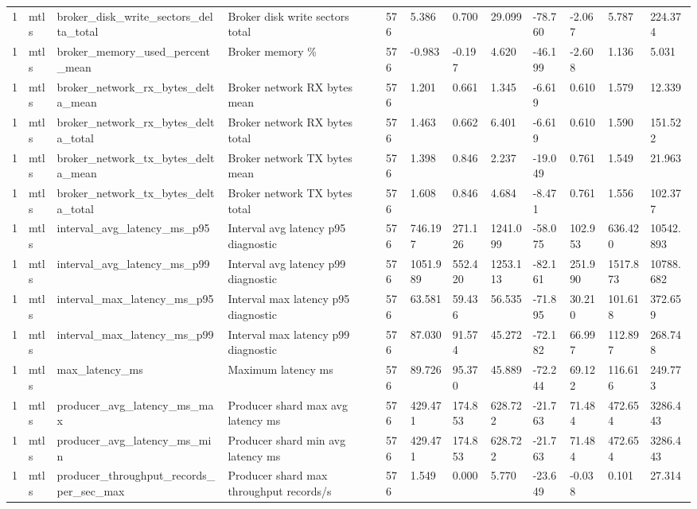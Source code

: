 \begin{longtable}{llllllllllll}
1 & mtls & broker\_disk\_write\_sectors\_delta\_total & Broker disk write sectors total & 576 & 5.386 & 0.700 & 29.099 & -78.760 & -2.067 & 5.787 & 224.374 \\
1 & mtls & broker\_memory\_used\_percent\_mean & Broker memory \% & 576 & -0.983 & -0.197 & 4.620 & -46.199 & -2.608 & 1.136 & 5.031 \\
1 & mtls & broker\_network\_rx\_bytes\_delta\_mean & Broker network RX bytes mean & 576 & 1.201 & 0.661 & 1.345 & -6.619 & 0.610 & 1.579 & 12.339 \\
1 & mtls & broker\_network\_rx\_bytes\_delta\_total & Broker network RX bytes total & 576 & 1.463 & 0.662 & 6.401 & -6.619 & 0.610 & 1.590 & 151.522 \\
1 & mtls & broker\_network\_tx\_bytes\_delta\_mean & Broker network TX bytes mean & 576 & 1.398 & 0.846 & 2.237 & -19.049 & 0.761 & 1.549 & 21.963 \\
1 & mtls & broker\_network\_tx\_bytes\_delta\_total & Broker network TX bytes total & 576 & 1.608 & 0.846 & 4.684 & -8.471 & 0.761 & 1.556 & 102.377 \\
1 & mtls & interval\_avg\_latency\_ms\_p95 & Interval avg latency p95 diagnostic & 576 & 746.197 & 271.126 & 1241.099 & -58.075 & 102.953 & 636.420 & 10542.893 \\
1 & mtls & interval\_avg\_latency\_ms\_p99 & Interval avg latency p99 diagnostic & 576 & 1051.989 & 552.420 & 1253.113 & -82.161 & 251.990 & 1517.873 & 10788.682 \\
1 & mtls & interval\_max\_latency\_ms\_p95 & Interval max latency p95 diagnostic & 576 & 63.581 & 59.436 & 56.535 & -71.895 & 30.210 & 101.618 & 372.659 \\
1 & mtls & interval\_max\_latency\_ms\_p99 & Interval max latency p99 diagnostic & 576 & 87.030 & 91.574 & 45.272 & -72.182 & 66.997 & 112.897 & 268.748 \\
1 & mtls & max\_latency\_ms & Maximum latency ms & 576 & 89.726 & 95.370 & 45.889 & -72.244 & 69.122 & 116.616 & 249.773 \\
1 & mtls & producer\_avg\_latency\_ms\_max & Producer shard max avg latency ms & 576 & 429.471 & 174.853 & 628.722 & -21.763 & 71.484 & 472.654 & 3286.443 \\
1 & mtls & producer\_avg\_latency\_ms\_min & Producer shard min avg latency ms & 576 & 429.471 & 174.853 & 628.722 & -21.763 & 71.484 & 472.654 & 3286.443 \\
1 & mtls & producer\_throughput\_records\_per\_sec\_max & Producer shard max throughput records/s & 576 & 1.549 & 0.000 & 5.770 & -23.649 & -0.038 & 0.101 & 27.314 \\

\end{longtable}
